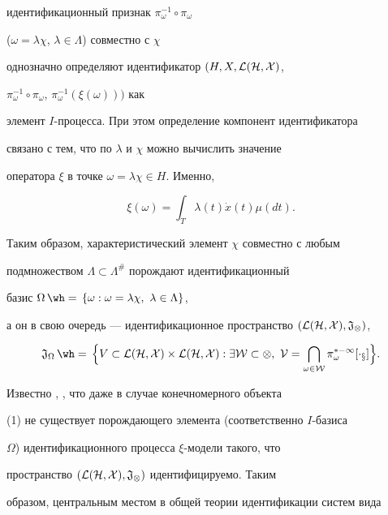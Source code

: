 идентификационный признак $\pi^{-1}_\omega\circ\pi_\omega$ 


($\omega=\lambda\chi$, $\lambda\in\Lambda$) совместно с $\chi$ 


однозначно определяют идентификатор $(H,X,\cal L(H,X)$, 


$\pi^{-1}_\omega\circ\pi_\omega$, $\pi^{-1}_\omega(\xi(\omega)))$ как 


элемент $I$-процесса. При этом определение компонент идентификатора 


связано с тем, что по $\lambda$ и $\chi$ можно вычислить значение 


оператора $\xi$ в точке $\omega=\lambda\chi\in H$. Именно, 


\begin{equation} 


\xi(\omega)=\int_T \lambda(t)\Dot x(t)\mu(dt). 


\end{equation} 


 


Таким образом, характеристический элемент $\chi$ совместно с любым 


подмножеством $\Lambda\subset\Lambda^{\#}$ порождают идентификационный 


базис $\Omega\hateq\{\omega: \omega=\lambda\chi,\ \lambda\in\Lambda\}$, 


а он в свою очередь --- идентификационное пространство $(\cal 


L(H,X),\frak J_{\Omega})$, 


$$ 


\frak J_\Omega\hateq\Big\{V\subset\cal L(H,X)\times \cal L(H,X): 


\exists W\subset\Omega,\ V=\bigcap_{\omega\in W} 


\pi^{*-1}_\omega[\Delta_x]\Big\}. 


$$ 


 


Известно \cite{2}, \cite{5}, что даже в случае конечномерного объекта 


(1) не существует порождающего элемента (соответственно $I$-базиса 


$\Omega$) идентификационного процесса $\xi$-модели такого, что 


пространство $(\cal L(H,X),\frak J_\Omega)$ идентифицируемо. Таким 


образом, центральным местом в общей теории идентификации систем вида 



